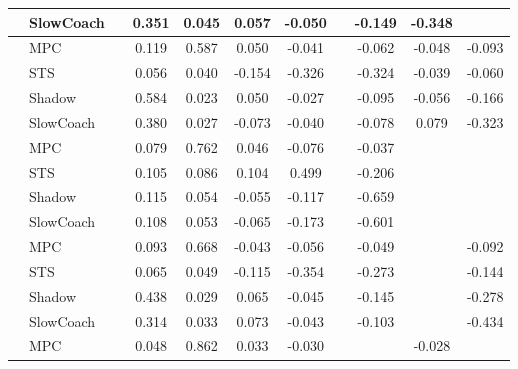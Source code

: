 \begin{tabular}{|l|l|*{9}{c|}}
                                                           & SlowCoach &       &     0.351 &     0.045 &  0.057 & -0.050 &     &  -0.149 &  -0.348 &       \\
\midrule
[False, True, True, True, True, False, True, True, True] & MPC &       &     0.119 &     0.587 &  0.050 & -0.041 &     &  -0.062 &  -0.048 &   -0.093 \\
                                                           & STS &       &     0.056 &     0.040 & -0.154 & -0.326 &     &  -0.324 &  -0.039 &   -0.060 \\
                                                           & Shadow &       &     0.584 &     0.023 &  0.050 & -0.027 &     &  -0.095 &  -0.056 &   -0.166 \\
                                                           & SlowCoach &       &     0.380 &     0.027 & -0.073 & -0.040 &     &  -0.078 &   0.079 &   -0.323 \\
\midrule
[False, True, True, True, True, False, True, False, False] & MPC &       &     0.079 &     0.762 &  0.046 & -0.076 &     &  -0.037 &      &       \\
                                                           & STS &       &     0.105 &     0.086 &  0.104 &  0.499 &     &  -0.206 &      &       \\
                                                           & Shadow &       &     0.115 &     0.054 & -0.055 & -0.117 &     &  -0.659 &      &       \\
                                                           & SlowCoach &       &     0.108 &     0.053 & -0.065 & -0.173 &     &  -0.601 &      &       \\
\midrule
[False, True, True, True, True, False, True, False, True] & MPC &       &     0.093 &     0.668 & -0.043 & -0.056 &     &  -0.049 &      &   -0.092 \\
                                                           & STS &       &     0.065 &     0.049 & -0.115 & -0.354 &     &  -0.273 &      &   -0.144 \\
                                                           & Shadow &       &     0.438 &     0.029 &  0.065 & -0.045 &     &  -0.145 &      &   -0.278 \\
                                                           & SlowCoach &       &     0.314 &     0.033 &  0.073 & -0.043 &     &  -0.103 &      &   -0.434 \\
\midrule
[False, True, True, True, True, False, False, True, False] & MPC &       &     0.048 &     0.862 &  0.033 & -0.030 &     &      &  -0.028 &       \\

\end{tabular}
